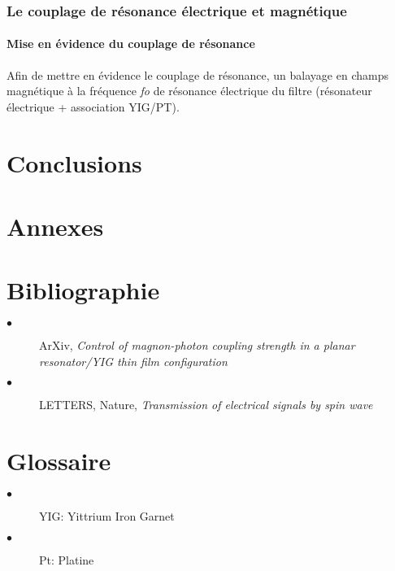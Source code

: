 \documentclass[12pt,fleqn]{book} %
\begin{document}
\section{Le couplage de résonance électrique et magnétique}
\subsection{Mise en évidence du couplage de résonance}
\indent Afin de mettre en évidence le couplage de résonance, un balayage en champs magnétique à la fréquence \emph{fo} de résonance électrique du filtre (résonateur électrique + association YIG/PT).

\part{Conclusions}

\setcounter{part}{-5}
\part{Annexes}

\setcounter{part}{-6}
\part{Bibliographie}
\label{Sources}
\appendix
\begin{description}
 \item[$\bullet$] ArXiv, \emph{Control of magnon-photon coupling strength in a planar resonator/YIG thin film configuration}
 \item[$\bullet$] LETTERS, Nature, \emph{Transmission of electrical signals by spin wave}
\end{description}

\setcounter{part}{-7}
\part{Glossaire}
\begin{description}
 \item[$\bullet$] YIG: Yittrium Iron Garnet
 \item[$\bullet$] Pt: Platine
\end{description}
\end{document}
